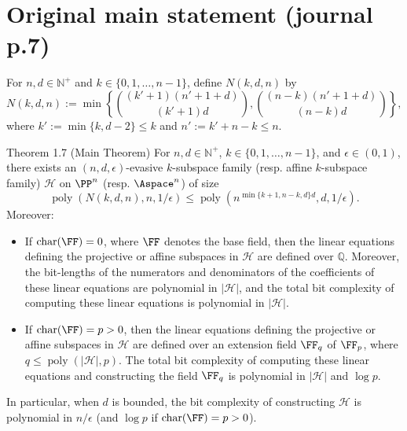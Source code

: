 \section*{Original main statement (journal p.7)}
For $n,d\in\mathbb N^+$ and $k\in\{0,1,\ldots,n-1\}$, define $N(k,d,n)$ by
\[N(k,d,n):=\min\left\{\binom{(k'+1)(n'+1+d)}{(k'+1)d},\binom{(n-k)(n'+1+d)}{(n-k)d}\right\},\]
where $k':=\min\{k,d-2\}\le k$ and $n':=k'+n-k\le n$.
\begin{result}{Theorem 1.7 (Main Theorem)}
For $n,d\in\mathbb N^+$, $k\in\{0,1,\ldots,n-1\}$, and $\epsilon\in(0,1)$, there exists an $(n,d,\epsilon)$-evasive $k$-subspace family (resp. affine $k$-subspace family) $\mathcal H$ on $\PP^n$ (resp. $\Aspace^n$) of size
\[\operatorname{poly}(N(k,d,n),n,1/\epsilon)\le\operatorname{poly}(n^{\min\{k+1,n-k,d\}d},d,1/\epsilon).\]
Moreover:
\begin{itemize}
\item If $\operatorname{char}(\FF)=0$, where $\FF$ denotes the base field, then the linear equations defining the projective or affine subspaces in $\mathcal H$ are defined over $\mathbb Q$. Moreover, the bit-lengths of the numerators and denominators of the coefficients of these linear equations are polynomial in $|\mathcal H|$, and the total bit complexity of computing these linear equations is polynomial in $|\mathcal H|$.
\item If $\operatorname{char}(\FF)=p>0$, then the linear equations defining the projective or affine subspaces in $\mathcal H$ are defined over an extension field $\FF_q$ of $\FF_p$, where $q\le\operatorname{poly}(|\mathcal H|,p)$. The total bit complexity of computing these linear equations and constructing the field $\FF_q$ is polynomial in $|\mathcal H|$ and $\log p$.
\end{itemize}
In particular, when $d$ is bounded, the bit complexity of constructing $\mathcal H$ is polynomial in $n/\epsilon$ (and $\log p$ if $\operatorname{char}(\FF)=p>0$).
\end{result}

